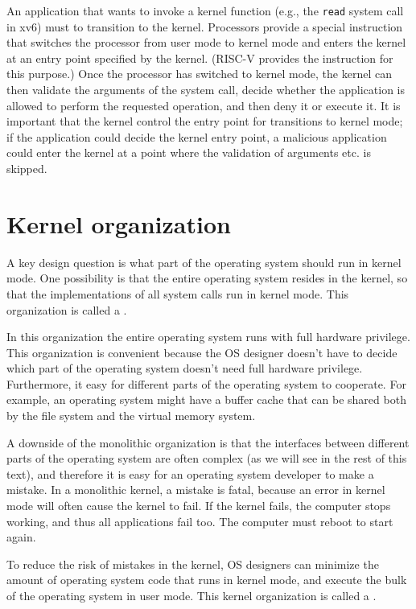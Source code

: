 An application that wants to invoke a kernel function (e.g., the
\lstinline{read}
system call in xv6) must to
transition to the kernel.  Processors provide a special instruction that switches the
processor from user mode to kernel mode and enters the kernel at an entry point
specified by the kernel.  (RISC-V
provides the 
instruction for this purpose.)  Once the processor has switched to kernel mode,
the kernel can then validate the arguments of the system call, decide whether
the application is allowed to perform the requested operation, and then deny it
or execute it.  It is important that the kernel control the entry point for
transitions to kernel mode; if the application could decide the kernel entry
point, a malicious application could enter the kernel at a point where the
validation of arguments etc. is skipped.
\section{Kernel organization}

A key design question is what part of the operating
system should run in kernel mode. 
One possibility is that the entire operating system resides
in the kernel, so that the implementations of all system calls
run in kernel mode.
This organization is called a
.

In this organization the entire operating system runs with full hardware
privilege. This organization is convenient because the OS designer doesn't have
to decide which part of the operating system doesn't need full hardware
privilege.  Furthermore, it easy for different parts of the operating system to
cooperate.  For example, an operating system might have a buffer cache that can
be shared both by the file system and the virtual memory system. 

A downside of the monolithic organization is that the interfaces between
different parts of the operating system are often complex (as we will see in the
rest of this text), and therefore it is easy for an operating system developer
to make a mistake.  In a monolithic kernel, a mistake is fatal, because an error
in kernel mode will often cause the kernel to fail.  If the kernel fails,
the computer stops working, and thus all applications fail too.  The computer
must reboot to start again.

To reduce the risk of mistakes in the kernel, OS designers can minimize the
amount of operating system code that runs in kernel mode, and execute the
bulk of the operating system in user mode.
This kernel organization is called a
.

